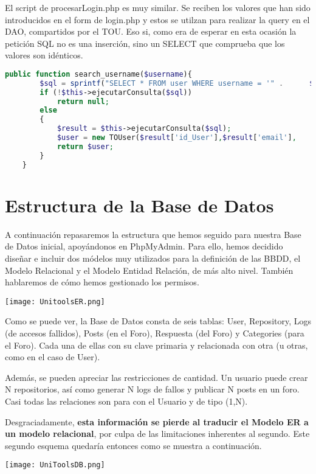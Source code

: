 \documentclass[12pt]{report}
\begin{document}
El script de procesarLogin.php es muy similar. Se reciben los valores que han sido introducidos en el form de login.php y estos se utilzan para realizar la query en el DAO, compartidos por el TOU. Eso si, como era de esperar en esta ocasión la petición SQL no es una inserción, sino un SELECT que comprueba que los valores son idénticos.
\newline
\begin{lstlisting}[language=PHP]
public function search_username($username){
		$sql = sprintf("SELECT * FROM user WHERE username = '" .      $username. "'");
		if (!$this->ejecutarConsulta($sql))
			return null;
		else 
		{
			$result = $this->ejecutarConsulta($sql);
			$user = new TOUser($result['id_User'],$result['email'],      $result['password'],$result['username'],$result['premium']);
			return $user;
		}	
	}
\end{lstlisting}

\newpage
\section{Estructura de la Base de Datos}
A continuación repasaremos la estructura que hemos seguido para nuestra Base de Datos inicial, apoyándonos en PhpMyAdmin. Para ello, hemos decidido diseñar e incluir dos módelos muy utilizados para la definición de las BBDD, el Modelo Relacional y el Modelo Entidad Relación, de más alto nivel. También hablaremos de cómo hemos gestionado los permisos.
\newline


\texttt{[image: UnitoolsER.png]}

Como se puede ver, la Base de Datos consta de seis tablas: User, Repository, Logs (de accesos fallidos), Posts (en el Foro), Respuesta (del Foro) y Categories (para el Foro). Cada una de ellas con su clave primaria y relacionada con otra (u otras, como en el caso de User). 

Además, se pueden apreciar las restricciones de cantidad. Un usuario puede crear N repositorios, así como generar N logs de fallos y publicar N posts en un foro. Casi todas las relaciones son para con el Usuario y de tipo (1,N). 

Desgraciadamente, \textbf{esta información se pierde al traducir el Modelo ER a un modelo relacional}, por culpa de las limitaciones inherentes al segundo. Este segundo esquema quedaría entonces como se muestra a continuación.
\newline

\texttt{[image: UniToolsDB.png]}
\end{document}
